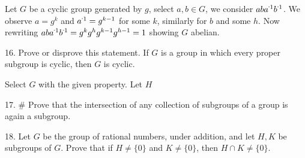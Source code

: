 \begin{mdframed}[style=darkAnswer,frametitle={Joe Starr}]
Let $G$ be a cyclic group generated by $g$, select $a,b\in G$, we consider 
$ab\inv{a}\inv{b}$. We observe $a=g^k$ and $\inv{a}=g^{k-1}$ for some $k$, 
similarly for $b$ and some $h$. Now rewriting 
$ab\inv{a}\inv{b}=g^kg^hg^{k-1}g^{h-1}=1$ showing $G$ abelian. 
\end{mdframed}
\newpage
\begin{mdframed}[style=darkQuesion]
16. Prove or disprove this statement. If $G$ is a group in which every proper subgroup is cyclic, then $G$ is cyclic.

\end{mdframed}

\begin{mdframed}[style=darkAnswer,frametitle={Joe Starr}]
Select $G$ with the given property. Let $H$
\end{mdframed}
\newpage
\begin{mdframed}[style=darkQuesion]
17. $\#$ Prove that the intersection of any collection of subgroups of a group is again a subgroup.

\end{mdframed}

\begin{mdframed}[style=darkAnswer,frametitle={Joe Starr}]

\end{mdframed}
\newpage
\begin{mdframed}[style=darkQuesion]
18. Let $G$ be the group of rational numbers, under addition, and let $H, K$ be subgroups
of $G .$ Prove that if $H \neq\{0\}$ and $K \neq\{0\}$, then $H \cap K \neq\{0\}$.

\end{mdframed}

